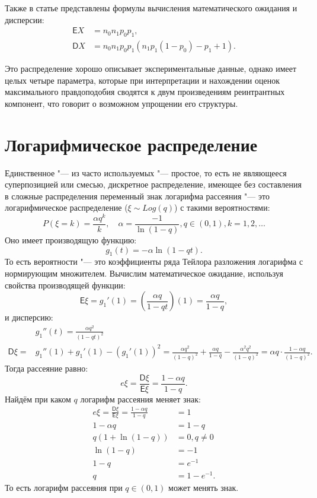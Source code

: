 \documentclass[12pt, specialist, subf, substylefile = spbu_report.rtx]{disser}
\begin{document}
	Также в статье представлены формулы вычисления математического ожидания и дисперсии:
	\begin{align*}
		\mathsf{E} X &= n _0 n _1 p _0 p_1,\\
		\mathsf{D} X &= n _0 n _1 p _0 p_1(n _1 p _1(1 - p _0) - p _1 + 1).
	\end{align*}

	Это распределение хорошо описывает экспериментальные данные, однако имеет целых четыре параметра, которые при интерпретации и нахождении оценок максимального правдоподобия сводятся к двум произведениям реинтрантных компонент, что говорит о возможном упрощении его структуры.

	\section{Логарифмическое распределение}
	
	Единственное "--- из часто используемых "--- простое, то есть не являющееся суперпозицией или смесью, дискретное распределение, имеющее без составления в сложные распределения переменный знак логарифма рассеяния "--- это логарифмическое распределение ($ \xi \sim Log(q) $) с такими вероятностями:
	\[
		P(\xi = k) = \frac {\alpha q ^k} {k},\quad \alpha = \frac {-1} {\ln (1 - q)}, q \in (0, 1), k = 1, 2, \dots
	\]
	Оно имеет производящую функцию:
	\[
		g _1(t) = -\alpha \ln (1 - qt).
	\]
	То есть вероятности "--- это коэффициенты ряда Тейлора разложения логарифма с нормирующим множителем. Вычислим математическое ожидание, используя свойства производящей функции:
	\[
		\mathsf{E} \xi = g _1' (1) = \left( \frac {\alpha q} {1 - qt} \right) (1) = \frac {\alpha q} {1 - q}, 
	\]
	и дисперсию:
	\[
		\begin{aligned}
			&g _1'' (t) = \frac {\alpha q ^2} {(1 - qt) ^2}\\
			\mathsf{D} \xi = &g _1''(1) + g _1'(1) - \left( g _1' (1) \right) ^2 = \frac {\alpha q ^2} {(1 - q) ^2} + \frac {\alpha q} {1 - q} - \frac {\alpha ^2 q ^2} {(1 - q) ^2} = \alpha q \cdot \frac {1 - \alpha q} {(1 - q) ^2}.
		\end{aligned}
	\]
	Тогда рассеяние равно:
	\[
		e\xi = \frac {\mathsf{D} \xi} {\mathsf{E} \xi} = \frac {1 - \alpha q} {1 - q}.
	\]
	Найдём при каком $ q $ логарифм рассеяния меняет знак:
	\[
		\begin{aligned}
			e\xi = \frac {\mathsf{D} \xi} {\mathsf{E} \xi} = \frac {1 - \alpha q} {1 - q} &= 1\\
			1 - \alpha q &= 1 - q\\
			q (1 + \ln (1 - q)) &= 0, q \not = 0\\
			\ln (1 - q) &= -1\\
			1 - q &= e ^{-1}\\
			q &= 1 - e ^{-1}.
		\end{aligned}
	\]
	То есть логарифм рассеяния при $ q \in (0, 1) $ может менять знак.
	
\end{document}
